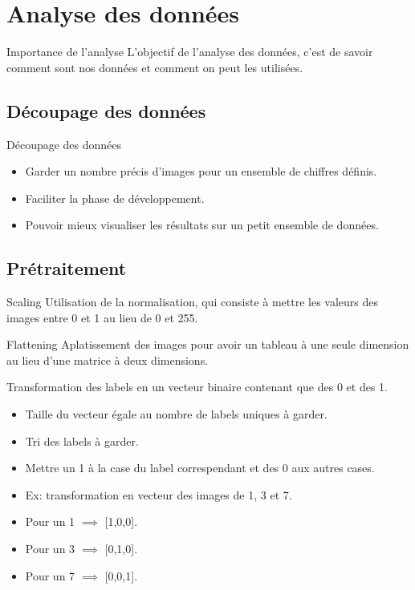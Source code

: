 \documentclass[10pt,handout]{beamer}
\begin{document}
\section{Analyse des données}
\begin{frame}
    \begin{block}{Importance de l'analyse}
        L'objectif de l'analyse des données, c'est de savoir comment sont nos données et comment on peut les utilisées.
    \end{block}
\end{frame}
 

\subsection{Découpage des données}

\begin{frame}{Découpage des données}
    \begin{itemize}
        \item Garder un nombre précis d’images pour un ensemble de chiffres définis.
        \item Faciliter la phase de développement.
        \item Pouvoir mieux visualiser les résultats sur un petit
        ensemble de données.
    \end{itemize}
\end{frame}

\subsection{Prétraitement}
\begin{block}{Scaling}
    Utilisation de la normalisation, qui consiste à
    mettre les valeurs des images entre 0 et 1 au lieu de 0 et 255.
\end{block}
\begin{block}{Flattening}
    Aplatissement des images pour avoir un tableau à une seule dimension au lieu d’une matrice à deux dimensions.
\end{block}
\begin{block}{}
    Transformation des labels en un vecteur binaire contenant que des 0 et des 1.
    \begin{itemize}
        \item Taille du vecteur égale au nombre de labels uniques à garder.
        \item Tri des labels à garder.
        \item Mettre un 1 à la case du label correspendant
        et des 0 aux autres cases.
        \item Ex: transformation en vecteur des images de 1, 3 et 7.
        \item Pour un 1 $\implies$ [1,0,0].
        \item Pour un 3 $\implies$ [0,1,0].
        \item Pour un 7 $\implies$ [0,0,1].
    \end{itemize}
\end{block}
\end{document}
